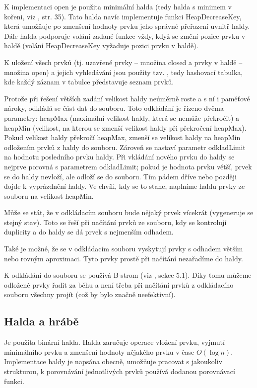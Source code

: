 \documentclass[12pt,notitlepage,fleqn]{report} %
\theoremstyle{definition}
\begin{document}
  K implementaci open je použita minimální halda (tedy halda s minimem v kořeni, viz \cite{pokorny}, str. 35). Tato halda navíc implementuje funkci HeapDecreaseKey, která umožňuje po zmenšení hodnoty prvku jeho správné přeřazení uvnitř haldy. Dále halda podporuje volání zadané funkce vždy, když se změní pozice prvku v haldě (volání HeapDecreaseKey vyžaduje pozici prvku v haldě).

  K uložení všech prvků (tj. uzavřené prvky -- množina closed a prvky v haldě -- množina open) a jejich vyhledávání jsou použity tzv. , tedy hashovací tabulka, kde každý záznam v tabulce představuje seznam prvků.

  Protože při řešení větších zadání velikost haldy neúměrně roste a s ní i paměťové nároky, odkládá se část dat do souboru. Toto odkládání je řízeno dvěma parametry: heapMax (maximální velikost haldy, která se nemůže překročit) a heapMin (velikost, na kterou se zmenší velikost haldy při překročení heapMax). Pokud velikost haldy překročí heapMax, zmenší se velikost haldy na heapMin odložením prvků z haldy do souboru. Zároveň se nastaví parametr odkladLimit na hodnotu posledního prvku haldy. Při vkládání nového prvku do haldy se nejprve porovná s parametrem odkladLimit; pokud je hodnota prvku větší, prvek se do haldy nevloží, ale odloží se do souboru. Tím pádem dříve nebo později dojde k vyprázdnění haldy. Ve chvíli, kdy se to stane, naplníme haldu prvky ze souboru na velikost heapMin.

  Může se stát, že v odkládacím souboru bude nějaký prvek vícekrát (vygeneruje se stejný stav). Toto se řeší při načítání prvků ze souboru, kdy se kontrolují duplicity a do haldy se dá prvek s nejmenším odhadem.

  Také je možné, že se v odkládacím souboru vyskytují prvky s odhadem větším nebo rovným aproximaci. Tyto prvky prostě při načítání nezařadíme do haldy.

  K odkládání do souboru se používá B-strom (viz \cite{pokorny}, sekce 5.1). Díky tomu můžeme odložené prvky řadit za běhu a není třeba při načítání prvků z odkládacího souboru všechny projít (což by bylo značně neefektivní).

  \subsection{Halda a hrábě}
    Je použita binární halda. Halda zaručuje operace vložení prvku, vyjmutí minimálního prvku a zmenšení hodnoty nějakého prvku v čase $O(\log n)$. Implementace haldy je napsána obecně, umožňuje pracovat s jakoukoliv strukturou, k porovnávání jednotlivých prvků používá dodanou porovnávací funkci.
\end{document}
